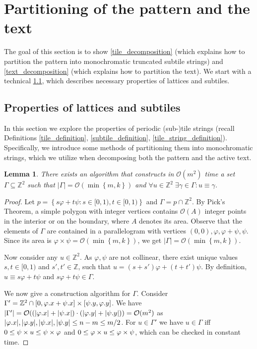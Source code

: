 \documentclass[11pt, letterpaper]{article}
\theoremstyle{plain}
\newtheorem{lemma}{Lemma}
\theoremstyle{definition}
\theoremstyle{remark}
\newcommand{\Z}{\mathbb{Z}}
\renewcommand{\O}{\mathcal{O}}
\renewcommand{\phi}{\varphi}
\newcommand{\set}[1]{\left\lbrace #1 \right\rbrace}
\begin{document}
\section{Partitioning of the pattern and the text}
The goal of this section is to show \cref{tile_decomposition} (which explains how to partition the pattern into monochromatic truncated subtile strings) and \cref{text_decomposition} (which explains how to partition the text). We start with a technical \cref{sec:lattices_subtiles}, which describes necessary properties of lattices and subtiles. 
 
\subsection{Properties of lattices and subtiles} \label{sec:lattices_subtiles}
In this section we explore the properties of periodic (sub-)tile strings (recall Definitions \ref{tile_definition}, \ref{subtile_definition}, \ref{tile_string_definition}).
Specifically, we introduce some methods of partitioning them into monochromatic strings, which we utilize when decomposing both the pattern and the active text.

\begin{lemma} \label{lattice_base}
	There exists an algorithm that constructs in $\O(m^2)$ time a set $\Gamma \subseteq \Z^2$ such that $|\Gamma| = \O(\min\set{m, k})$ and $\forall u \in \Z^2 \; \exists \gamma \in \Gamma : u \equiv \gamma$.
\end{lemma} 
	\begin{proof}
		Let $p = \set{s\phi + t\psi : s \in [0, 1), t \in [0, 1)}$ and $\Gamma = p \cap \Z^2$.
		By Pick's Theorem, a simple polygon with integer vertices contains $\O(A)$ integer points in the interior or on the boundary, where $A$ denotes its area.
		Observe that the elements of $\Gamma$ are contained in a parallelogram with vertices $(0, 0), \phi, \phi + \psi, \psi$.
		Since its area is $\phi \times \psi = \O(\min\set{m, k})$, we get $|\Gamma| = \O(\min\set{m, k})$.
		
		Now consider any $u \in \Z^2$.
		As $\phi, \psi$ are not collinear, there exist unique values $s, t \in [0, 1)$ and $s', t' \in \Z$, such that
		$u = (s + s') \phi + (t + t') \psi$.
		By definition, 
		$u \equiv s\phi + t\psi$ and $s\phi + t\psi \in \Gamma$.
		
		We now give a construction algorithm for $\Gamma$. Consider $\Gamma' = \Z^2 \cap [0,\x{\phi}+\x{\psi}] \times [\y{\psi},\y{\phi}]$. We have $|\Gamma'| = \O((|\x{\phi}|+|\x{\psi}|) \cdot (|\y{\phi}|+|\y{\psi}|)) = \O(m^2)$ as $|\x{\phi}|, |\y{\phi}|, |\x{\psi}|, |\y{\psi}| \le n - m \le m / 2$. For $u \in \Gamma'$ we have $u \in \Gamma$ iff $0 \le \s{u} \le \s{\phi}$ and $0 \le \h{u} \le \h{\psi}$, which can be checked in constant time. 
	\end{proof}
\end{document}
